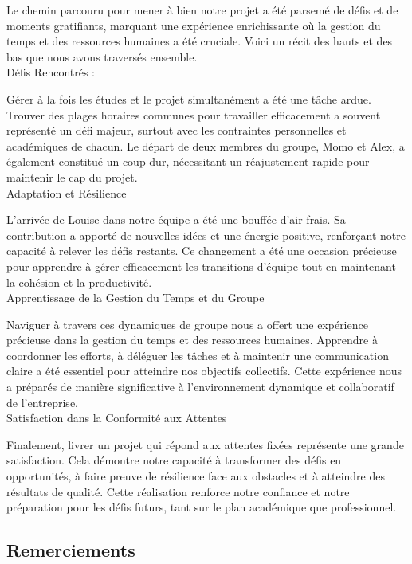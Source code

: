 Le chemin parcouru pour mener à bien notre projet a été parsemé de défis et de moments gratifiants, marquant une expérience enrichissante où la gestion du 
temps et des ressources humaines a été cruciale. Voici un récit des hauts et des bas que nous avons traversés ensemble.
\\

Défis Rencontrés :

Gérer à la fois les études et le projet simultanément a été une tâche ardue. Trouver des plages horaires communes pour travailler efficacement a souvent
 représenté un défi majeur, surtout avec les contraintes personnelles et académiques de chacun. Le départ de deux membres du groupe, Momo et Alex, 
 a également constitué un coup dur, nécessitant un réajustement rapide pour maintenir le cap du projet.
\\

Adaptation et Résilience

L'arrivée de Louise dans notre équipe a été une bouffée d'air frais. Sa contribution a apporté de nouvelles idées et une énergie positive, renforçant 
notre capacité à relever les défis restants. Ce changement a été une occasion précieuse pour apprendre à gérer efficacement les transitions d'équipe 
tout en maintenant la cohésion et la productivité.
\\

Apprentissage de la Gestion du Temps et du Groupe

Naviguer à travers ces dynamiques de groupe nous a offert une expérience précieuse dans la gestion du temps et des ressources humaines. Apprendre à 
coordonner les efforts, à déléguer les tâches et à maintenir une communication claire a été essentiel pour atteindre nos objectifs collectifs. Cette 
expérience nous a préparés de manière significative à l'environnement dynamique et collaboratif de l'entreprise.
\\

Satisfaction dans la Conformité aux Attentes

Finalement, livrer un projet qui répond aux attentes fixées représente une grande satisfaction. Cela démontre notre capacité à transformer des défis 
en opportunités, à faire preuve de résilience face aux obstacles et à atteindre des résultats de qualité. Cette réalisation renforce notre confiance et 
notre préparation pour les défis futurs, tant sur le plan académique que professionnel.


\subsection{Remerciements}



